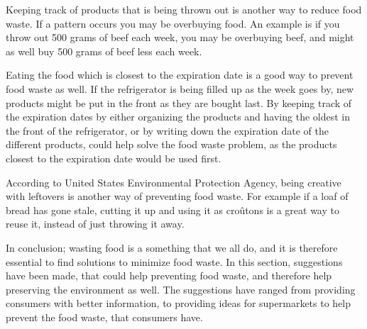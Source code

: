 Keeping track of products that is being thrown out is another way to reduce food waste. If a pattern occurs you may be overbuying food. An example is if you throw out 500 grams of beef each week, you may be overbuying beef, and might as well buy 500 grams of beef less each week\cite{madSpild_Greatist}.

Eating the food which is closest to the expiration date is a good way to prevent food waste as well. If the refrigerator is being filled up as the week goes by, new products might be put in the front as they are bought last. By keeping track of the expiration dates by either organizing the products and having the oldest in the front of the refrigerator, or by writing down the expiration date of the different products, could help solve the food waste problem, as the products closest to the expiration date would be used first. 

According to United States Environmental Protection Agency\cite{madSpild_EPA}, being creative with leftovers is another way of preventing food waste. For example if a loaf of bread has gone stale, cutting it up and using it as croûtons is a great way to reuse it, instead of just throwing it away.

In conclusion; wasting food is a something that we all do, and it is therefore essential to find solutions to minimize food waste. In this section, suggestions have been made, that could help preventing food waste, and therefore help preserving the environment as well. The suggestions have ranged from providing consumers with better information, to providing ideas for supermarkets to help prevent the food waste, that consumers have.